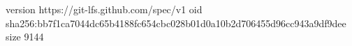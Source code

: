 version https://git-lfs.github.com/spec/v1
oid sha256:bb7f1ca7044dc65b4188fc654cbc028b01d0a10b2d706455d96cc943a9df9dee
size 9144
